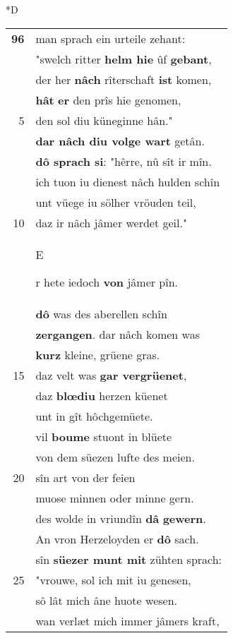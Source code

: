\documentclass[8pt,a4paper,notitlepage]{article}
\begin{document}
\begin{table}[ht]
\begin{minipage}[t]{0.5\linewidth}
\small
\begin{center}*D
\end{center}
\begin{tabular}{rl}
\textbf{96} & man sprach ein urteile zehant:\\ 
 & "swelch ritter \textbf{helm hie} ûf \textbf{gebant},\\ 
 & der her \textbf{nâch} rîterschaft \textbf{ist} komen,\\ 
 & \textbf{hât} \textbf{er} den prîs hie genomen,\\ 
5 & den sol diu küneginne hân."\\ 
 & \textbf{dar nâch diu volge wart} getân.\\ 
 & \textbf{dô sprach si}: "hêrre, nû sît ir mîn.\\ 
 & ich tuon iu dienest nâch hulden schîn\\ 
 & unt vüege iu sölher vröuden teil,\\ 
10 & daz ir nâch jâmer werdet geil."\\ 
 & \begin{large}E\end{large}r hete iedoch \textbf{von} jâmer pîn.\\ 
 & \textbf{dô} was des aberellen schîn\\ 
 & \textbf{zergangen}. dar nâch komen was\\ 
 & \textbf{kurz} kleine, grüene gras.\\ 
15 & daz velt was \textbf{gar vergrüenet},\\ 
 & daz \textbf{blœdiu} herzen küenet\\ 
 & unt in gît hôchgemüete.\\ 
 & vil \textbf{boume} stuont in blüete\\ 
 & von dem süezen lufte des meien.\\ 
20 & sîn art von der feien\\ 
 & muose minnen oder minne gern.\\ 
 & des wolde in vriundîn \textbf{dâ} \textbf{gewern}.\\ 
 & An vron Herzeloyden er \textbf{dô} sach.\\ 
 & sîn \textbf{süezer munt mit} zühten sprach:\\ 
25 & "vrouwe, sol ich mit iu genesen,\\ 
 & sô lât mich âne huote wesen.\\ 
 & wan verlæt mich immer jâmers kraft,\\ 

\end{tabular}
\end{minipage}
\end{table}
\end{document}
